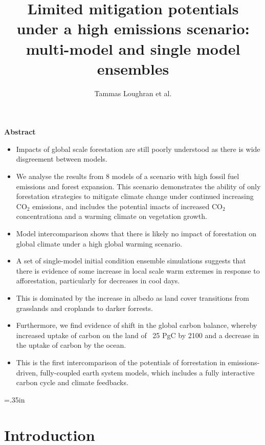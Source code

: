 \documentclass[]{article}
\title{Limited mitigation potentials under a high emissions scenario: multi-model and single model ensembles}
\author{Tammas Loughran et al.}
\begin{document}
\maketitle

\begin{center}
    \Large
    \vspace{0.9cm}
    \textbf{Abstract}
\end{center}

\begin{itemize}
    \item Impacts of global scale forestation are still poorly understood as there is wide disgreement between models.
    \item We analyse the results from 8 models of a scenario with high fossil fuel emissions and forest expansion. This scenario demonstrates the ability of only forestation strategies to mitigate climate change under continued increasing CO$_2$ emissions, and includes the potential imacts of increased CO$_2$ concentrationa and a warming climate on vegetation growth.
    \item Model intercomparison shows that there is likely no impact of forestation on global climate under a high global warming scenario.
    \item A set of single-model initial condition ensemble simulations suggests that there is evidence of some increase in local scale warm extremes in response to afforestation, particularly for decreases in cool days.
    \item This is dominated by the increase in albedo as land cover transitions from grasslands and croplands to darker forrests.
    \item Furthermore, we find evidence of shift in the global carbon balance, whereby increased uptake of carbon on the land of ~25 PgC by 2100 and a decrease in the uptake of carbon by the ocean.
    \item This is the first intercomparison of the potentials of forrestation in emissions-driven, fully-coupled earth system models, which includes a fully interactive carbon cycle and climate feedbacks.
\end{itemize}

\raggedright
\parindent=.35in %

\section{Introduction}
\end{document}
